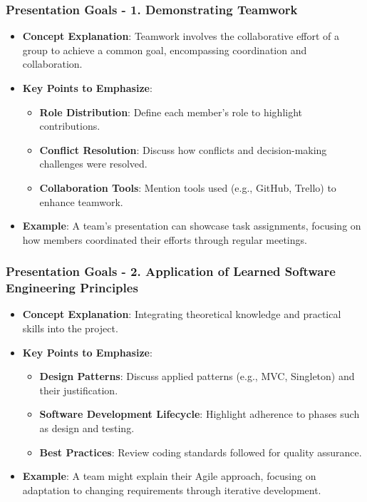 \documentclass{beamer}
\begin{document}
\begin{frame}[fragile]
    \frametitle{Presentation Goals - 1. Demonstrating Teamwork}
    \begin{itemize}
        \item \textbf{Concept Explanation}: Teamwork involves the collaborative effort of a group to achieve a common goal, encompassing coordination and collaboration.
        
        \item \textbf{Key Points to Emphasize}:
        \begin{itemize}
            \item \textbf{Role Distribution}: Define each member's role to highlight contributions.
            \item \textbf{Conflict Resolution}: Discuss how conflicts and decision-making challenges were resolved.
            \item \textbf{Collaboration Tools}: Mention tools used (e.g., GitHub, Trello) to enhance teamwork.
        \end{itemize}
        
        \item \textbf{Example}: A team's presentation can showcase task assignments, focusing on how members coordinated their efforts through regular meetings.
    \end{itemize}
\end{frame}

\begin{frame}[fragile]
    \frametitle{Presentation Goals - 2. Application of Learned Software Engineering Principles}
    \begin{itemize}
        \item \textbf{Concept Explanation}: Integrating theoretical knowledge and practical skills into the project.
        
        \item \textbf{Key Points to Emphasize}:
        \begin{itemize}
            \item \textbf{Design Patterns}: Discuss applied patterns (e.g., MVC, Singleton) and their justification.
            \item \textbf{Software Development Lifecycle}: Highlight adherence to phases such as design and testing.
            \item \textbf{Best Practices}: Review coding standards followed for quality assurance.
        \end{itemize}
        
        \item \textbf{Example}: A team might explain their Agile approach, focusing on adaptation to changing requirements through iterative development.
    \end{itemize}
\end{frame}
\end{document}

